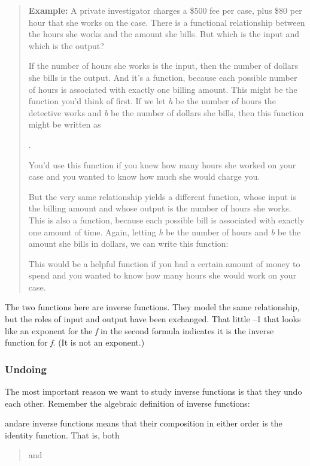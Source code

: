 \begin{quote}
\textbf{Example:} A private investigator charges a \$500 fee per case,
plus \$80 per hour that she works on the case. There is a functional
relationship between the hours she works and the amount she bills. But
which is the input and which is the output?

If the number of hours she works is the input, then the number of
dollars she bills is the output. And it's a function, because each
possible number of hours is associated with exactly one billing amount.
This might be the function you'd think of first. If we let \emph{h} be
the number of hours the detective works and \emph{b} be the number of
dollars she bills, then this function might be written as

.

You'd use this function if you knew how many hours she worked on your
case and you wanted to know how much she would charge you.

But the very same relationship yields a different function, whose input
is the billing amount and whose output is the number of hours she works.
This is also a function, because each possible bill is associated with
exactly one amount of time. Again, letting \emph{h} be the number of
hours and \emph{b} be the amount she bills in dollars, we can write this
function:

This would be a helpful function if you had a certain amount of money to
spend and you wanted to know how many hours she would work on your case.
\end{quote}

The two functions here are inverse functions. They model the same
relationship, but the roles of input and output have been exchanged.
That little --1 that looks like an exponent for the \emph{f} in the
second formula indicates it is the inverse function for \emph{f}. (It is
not an exponent.)

\subsubsection{Undoing }\label{undoing}

The most important reason we want to study inverse functions is that
they undo each other. Remember the algebraic definition of inverse
functions:

andare inverse functions means that their composition in either order is
the identity function. That is, both

\begin{quote}
and
\end{quote}


